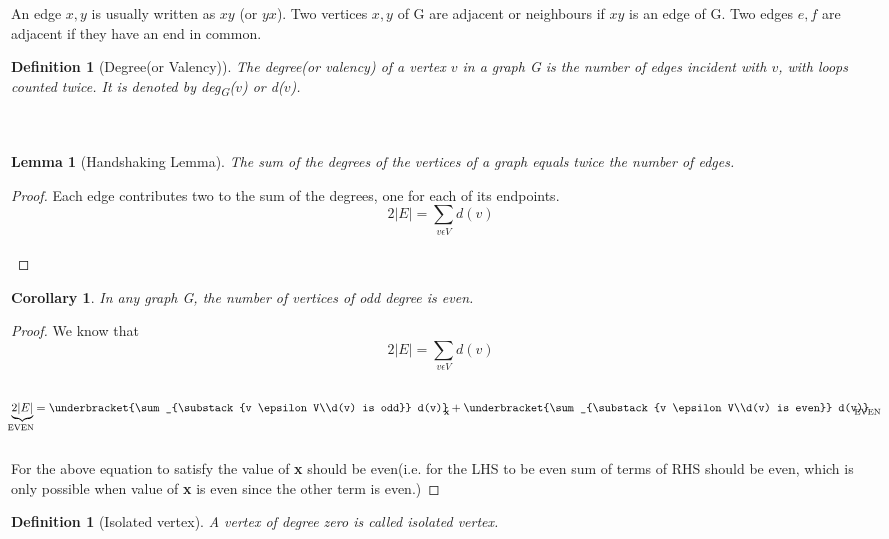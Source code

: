 \documentclass{article}
\newtheorem{lemma}[theorem]{Lemma}
\newtheorem{corollary}[theorem]{Corollary}
\newtheorem{definition}[theorem]{Definition}
\begin{document}
\quad An edge ${x,y}$ is usually written as $xy$ (or $yx$). 
Two vertices ${x,y}$ of G are adjacent or neighbours if $xy$ is an edge of G. 
Two edges $e,f$ are adjacent if they have an end in common.

\begin{definition}[Degree(or Valency)]
\quad The \emph{degree(or valency)} of a vertex $v$ in a graph G is the number of edges incident with $v$, 
with loops counted twice. It is denoted by deg\textsubscript{G}($v$) or d($v$).\\~\\~\\
\end{definition}

\begin{lemma}[Handshaking Lemma]
The sum of the degrees of the vertices of a graph equals twice the number of edges.
\end{lemma}

\begin{proof}
Each edge contributes two to the sum of the degrees, one for each of its endpoints.
$$ 2|E| = \sum_{v \epsilon V} d(v)$$\\
\end{proof}

\begin{corollary}
In any graph G, the number of vertices of odd degree is even.
\end{corollary}

\begin{proof}
We know that
$$ 2|E| = \sum_{v \epsilon V} d(v)$$\\
$$ \underbrace{2|E|}_\text{\clap{EVEN~}} = 
\underbracket{\sum_{\substack{v \epsilon V\\d(v) is odd}} d(v)}_\text{\clap{\textbf{x~}}} 
+ \underbracket{\sum_{\substack{v \epsilon V\\d(v) is even}} d(v)}_\text{\clap{EVEN~}} $$\\
\quad For the above equation to satisfy the value of \textbf{x} should be even(i.e. for the LHS 
to be even sum of terms of RHS should be even, which is only possible when value of \textbf{x}
is even since the other term is even.)
\end{proof}

\begin{definition}[Isolated vertex]
\quad A vertex of degree zero is called isolated vertex.\\
\end{definition}
\end{document}

